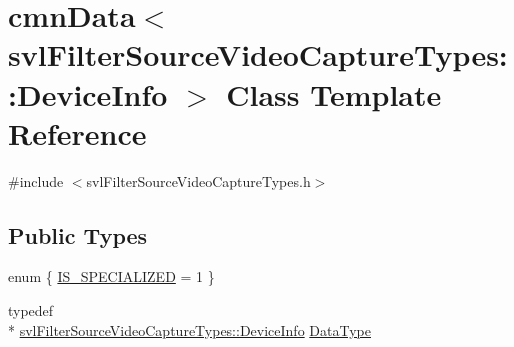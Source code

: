 \hypertarget{classcmn_data_3_01svl_filter_source_video_capture_types_1_1_device_info_01_4}{\section{cmn\-Data$<$ svl\-Filter\-Source\-Video\-Capture\-Types\-:\-:Device\-Info $>$ Class Template Reference}
\label{classcmn_data_3_01svl_filter_source_video_capture_types_1_1_device_info_01_4}
}


{\ttfamily \#include $<$svl\-Filter\-Source\-Video\-Capture\-Types.\-h$>$}

\subsection*{Public Types}
\begin{DoxyCompactItemize}
\item 
enum \{ \hyperlink{classcmn_data_3_01svl_filter_source_video_capture_types_1_1_device_info_01_4_a759e1517e69816631066edff4edfbddfabab1017c2f050ed948aceb6bb647ac49}{I\-S\-\_\-\-S\-P\-E\-C\-I\-A\-L\-I\-Z\-E\-D} = 1
 \}
\item 
typedef \\*
\hyperlink{classsvl_filter_source_video_capture_types_1_1_device_info}{svl\-Filter\-Source\-Video\-Capture\-Types\-::\-Device\-Info} \hyperlink{classcmn_data_3_01svl_filter_source_video_capture_types_1_1_device_info_01_4_afce8b1b6d893ddc5d505f2f1574ac4af}{Data\-Type}
\end{DoxyCompactItemize}
